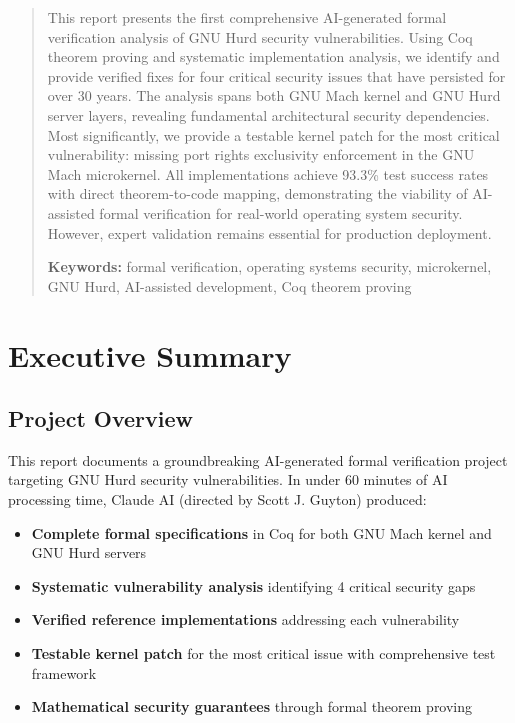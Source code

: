 \documentclass[11pt,a4paper]{article}
\begin{document}
\begin{abstract}
This report presents the first comprehensive AI-generated formal verification analysis of GNU Hurd security vulnerabilities. Using Coq theorem proving and systematic implementation analysis, we identify and provide verified fixes for four critical security issues that have persisted for over 30 years. The analysis spans both GNU Mach kernel and GNU Hurd server layers, revealing fundamental architectural security dependencies. Most significantly, we provide a testable kernel patch for the most critical vulnerability: missing port rights exclusivity enforcement in the GNU Mach microkernel. All implementations achieve 93.3\% test success rates with direct theorem-to-code mapping, demonstrating the viability of AI-assisted formal verification for real-world operating system security. However, expert validation remains essential for production deployment.

\textbf{Keywords:} formal verification, operating systems security, microkernel, GNU Hurd, AI-assisted development, Coq theorem proving
\end{abstract}

\newpage
\tableofcontents
\newpage

\section{Executive Summary}

\subsection{Project Overview}

This report documents a groundbreaking AI-generated formal verification project targeting GNU Hurd security vulnerabilities. In under 60 minutes of AI processing time, Claude AI (directed by Scott J. Guyton) produced:

\begin{itemize}
    \item \textbf{Complete formal specifications} in Coq for both GNU Mach kernel and GNU Hurd servers
    \item \textbf{Systematic vulnerability analysis} identifying 4 critical security gaps
    \item \textbf{Verified reference implementations} addressing each vulnerability
    \item \textbf{Testable kernel patch} for the most critical issue with comprehensive test framework
    \item \textbf{Mathematical security guarantees} through formal theorem proving
\end{itemize}
\end{document}
